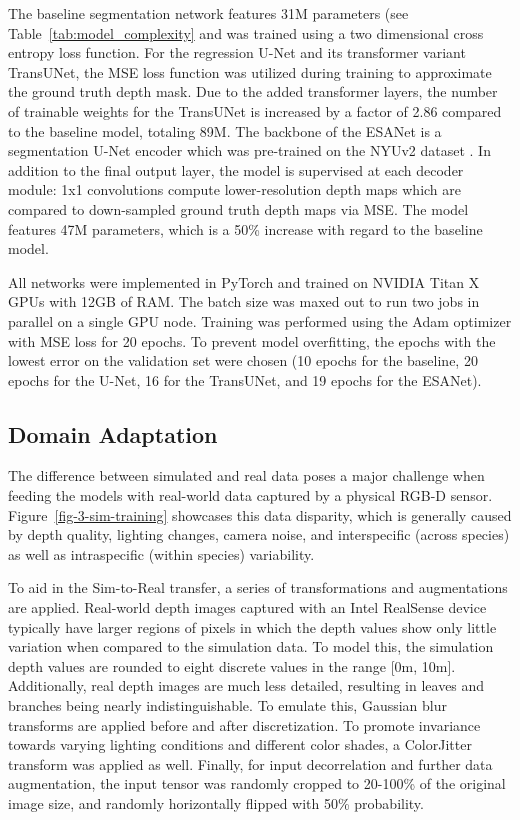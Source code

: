 The baseline segmentation network features 31M parameters (see Table~\ref{tab:model_complexity} and was trained using a two dimensional cross entropy loss function. For the regression U-Net and its transformer variant TransUNet, the MSE loss function was utilized during training to approximate the ground truth depth mask. Due to the added transformer layers, the number of trainable weights for the TransUNet is increased by a factor of 2.86 compared to the baseline model, totaling 89M. The backbone of the ESANet is a segmentation U-Net encoder which was pre-trained on the NYUv2 dataset \cite{Silberman2012}. In addition to the final output layer, the model is supervised at each decoder module: 1x1 convolutions compute lower-resolution depth maps which are compared to down-sampled ground truth depth maps via MSE. The model features 47M parameters, which is a 50\% increase with regard to the baseline model.

All networks were implemented in PyTorch and trained on NVIDIA Titan X GPUs with 12GB of RAM. The batch size was maxed out to run two jobs in parallel on a single GPU node. Training was performed using the Adam optimizer \cite{kingma2017adam} with MSE loss for 20 epochs. To prevent model overfitting, the epochs with the lowest error on the validation set were chosen (10 epochs for the baseline, 20 epochs for the U-Net, 16 for the TransUNet, and 19 epochs for the ESANet).

\subsection{Domain Adaptation} \label{subsec:domain_adaptation}
The difference between simulated and real data poses a major challenge when feeding the models with real-world data captured by a physical RGB-D sensor. Figure~\ref{fig-3-sim-training} showcases this data disparity, which is generally caused by depth quality, lighting changes, camera noise, and interspecific (across species) as well as intraspecific (within species) variability. 

To aid in the Sim-to-Real transfer, a series of transformations and augmentations are applied. 
Real-world depth images captured with an Intel RealSense device typically have larger regions of pixels in which the depth values show only little variation when compared to the simulation data. To model this, the simulation depth values are rounded to eight discrete values in the range [0m, 10m]. Additionally, real depth images are much less detailed, resulting in leaves and branches being nearly indistinguishable. To emulate this, Gaussian blur transforms are applied before and after discretization. To promote invariance towards varying lighting conditions and different color shades, a ColorJitter transform was applied as well. Finally, for input decorrelation and further data augmentation, the input tensor was randomly cropped to 20-100\% of the original image size, and randomly horizontally flipped with 50\% probability.


